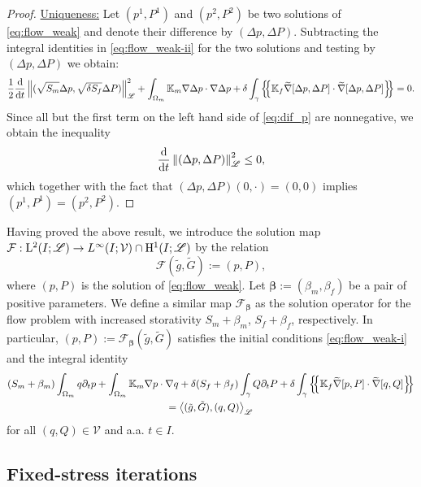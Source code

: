 \documentclass[a4paper]{m2an}
\numberwithin{equation}{section}
\def\agrad{\widetilde\nabla}
\def\avg#1{\left\{\mskip-5mu\left\{#1\right\}\mskip-5mu\right\}}
\def\bbeta{\boldsymbol{\beta}}
\def\ddt#1{\xdrv{#1}{t}}
\def\dt{\prtl_t}
\def\dual#1#2{\left\langle #1,#2\right\rangle}
\def\Hf{\mathscr{L}} %
\def\norm#1{\left\|#1\right\|}
\def\prtl{\partial}
\def\tn#1{{\mathbb{#1}}}    %
\def\Vf{{\mathcal V}} %
\newcommand{\eq}[1]{\begin{equation}#1\end{equation}}
\newcommand{\eqs}[1]{\begin{equation*}#1\end{equation*}}
\newcommand{\ml}[1]{\begin{multline}#1\end{multline}}
\begin{document}
\begin{proof}
\underline{Uniqueness:}
Let $(p^1,P^1)$ and $(p^2,P^2)$ be two solutions of \eqref{eq:flow_weak} and denote their difference by $(\Delta p,\Delta P)$.
Subtracting the integral identities in \eqref{eq:flow_weak-ii} for the two solutions and testing by $(\Delta p,\Delta P)$ we obtain:
\eq{ \label{eq:dif_p} \frac12\ddt{}\norm{(\sqrt{S_m}\Delta p,\sqrt{\delta S_f}\Delta P)}_\Hf^2
+ \int_{\Omega_m}\tn K_m\nabla\Delta p\cdot\nabla\Delta p
+ \delta\int_\gamma\avg{\tn K_f\agrad[\Delta p,\Delta P]\cdot\agrad[\Delta p,\Delta P]} = 0. }
Since all but the first term on the left hand side of \eqref{eq:dif_p} are nonnegative, we obtain the inequality
\eqs{ \ddt{}\norm{(\Delta p,\Delta P)}_\Hf^2 \le 0, }
which together with the fact that $(\Delta p,\Delta P)(0,\cdot) = (0,0)$ implies $(p^1,P^1)=(p^2,P^2)$.
\end{proof}
% 
Having proved the above result, we introduce the solution map $\mathcal F:\xLtwo(I;\Hf)\to L^\infty(I;\Vf)\cap \xHone(I;\Hf)$ by the relation
\eqs{ \mathcal F(\tilde g,\tilde G) := (p,P), }
where $(p,P)$ is the solution of \eqref{eq:flow_weak}.
Let $\bbeta:=(\beta_m,\beta_f)$ be a pair of positive parameters.
We define a similar map $\mathcal F_{\bbeta}$ as the solution operator for the flow problem with increased storativity $S_m+\beta_m$, $S_f+\beta_f$, respectively.
In particular, $(p,P):=\mathcal F_{\bbeta}(\tilde g,\tilde G)$ satisfies the initial conditions 
\eqref{eq:flow_weak-i} and the integral identity
\ml{ \label{eq:flow_problem_beta} (S_m+\beta_m)\int_{\Omega_m} q\dt p + \int_{\Omega_m}\tn K_m\nabla p\cdot\nabla q + \delta (S_f+\beta_f)\int_\gamma Q\dt P
+ \delta\int_\gamma\avg{\tn K_f\agrad[p,P]\cdot\agrad[q,Q]}\\
= \dual{(\tilde g,\tilde G)}{(q,Q)}_\Hf }
for all $(q,Q)\in\Vf$ and a.a. $t\in I$.



\subsection{Fixed-stress iterations}\label{sec:iter}
\end{document}
